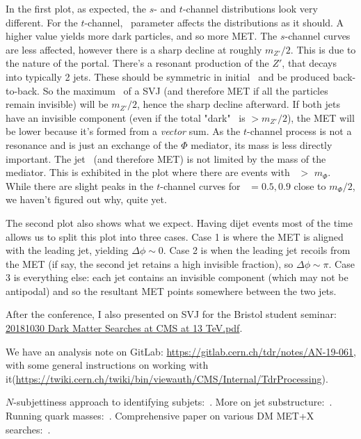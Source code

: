 In the first plot, as expected, the $s$- and $t$-channel distributions look very different. For the $t$-channel, \rinv\ parameter affects the distributions as it should. A higher value yields more dark particles, and so more MET. The $s$-channel curves are less affected, however there is a sharp decline at roughly $m_{Z'}/2$. This is due to the nature of the portal. There's a resonant production of the $Z'$, that decays into typically 2 jets. These should be symmetric in initial \pT\ and be produced back-to-back. So the maximum \pT\ of a SVJ (and therefore MET if all the particles remain invisible) will be $m_{Z'}/2$, hence the sharp decline afterward. If both jets have an invisible component (even if the total "dark" \pT\ is $> m_{Z'}/2$), the MET will be lower because it's formed from a \emph{vector} sum. As the $t$-channel process is not a resonance and is just an exchange of the $\Phi$ mediator, its mass is less directly important. The jet \pT\ (and therefore MET) is not limited by the mass of the mediator. This is exhibited in the plot where there are events with \ptmiss\ $>$ $m_{\Phi}$. While there are slight peaks in the $t$-channel curves for \rinv\ $= 0.5, 0.9$ close to $m_{\Phi}/2$, we haven't figured out why, quite yet.

The second plot also shows what we expect. Having dijet events most of the time allows us to split this plot into three cases. Case 1 is where the MET is aligned with the leading jet, yielding $\Delta\phi \sim 0$. Case 2 is when the leading jet recoils from the MET (if say, the second jet retains a high invisible fraction), so $\Delta\phi \sim \pi$. Case 3 is everything else: each jet contains an invisible component (which may not be antipodal) and so the resultant MET points somewhere between the two jets.

After the conference, I also presented on SVJ for the Bristol student seminar: \href{run:modules/Sec 35 - Semi-visible jets analysis/figures/20181030 Dark Matter Searches at CMS at 13 TeV.pdf}{20181030 Dark Matter Searches at CMS at 13 TeV.pdf}.

We have an analysis note on GitLab: \url{https://gitlab.cern.ch/tdr/notes/AN-19-061}, with some general instructions on working with it(\url{https://twiki.cern.ch/twiki/bin/viewauth/CMS/Internal/TdrProcessing}).

$N$-subjettiness approach to identifying subjets:~\cite{Thaler:2010tr}.
More on jet substructure:~\cite{Freytsis:2014hpa}.
Running quark masses:~\cite{Bednyakov:2016onn}.
Comprehensive paper on various DM MET+X searches:~\cite{Aaboud:2019yqu}.
